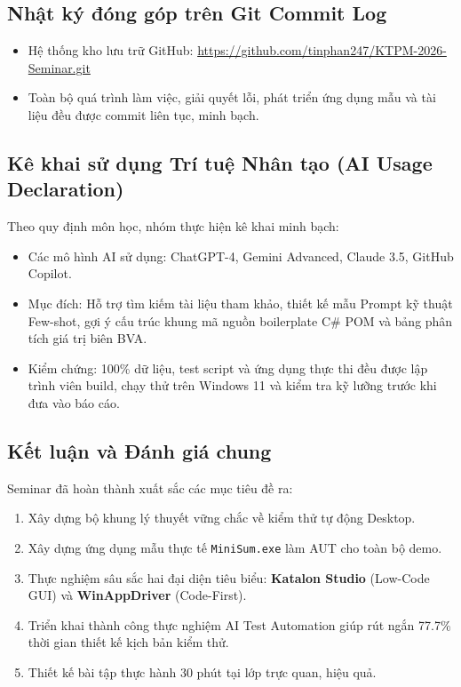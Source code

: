 \subsection{Nhật ký đóng góp trên Git Commit Log}
\begin{itemize}
    \item Hệ thống kho lưu trữ GitHub: \url{https://github.com/tinphan247/KTPM-2026-Seminar.git}
    \item Toàn bộ quá trình làm việc, giải quyết lỗi, phát triển ứng dụng mẫu và tài liệu đều được commit liên tục, minh bạch.
\end{itemize}

\subsection{Kê khai sử dụng Trí tuệ Nhân tạo (AI Usage Declaration)}
Theo quy định môn học, nhóm thực hiện kê khai minh bạch:
\begin{itemize}
    \item Các mô hình AI sử dụng: ChatGPT-4, Gemini Advanced, Claude 3.5, GitHub Copilot.
    \item Mục đích: Hỗ trợ tìm kiếm tài liệu tham khảo, thiết kế mẫu Prompt kỹ thuật Few-shot, gợi ý cấu trúc khung mã nguồn boilerplate C\# POM và bảng phân tích giá trị biên BVA.
    \item Kiểm chứng: 100\% dữ liệu, test script và ứng dụng thực thi đều được lập trình viên build, chạy thử trên Windows 11 và kiểm tra kỹ lưỡng trước khi đưa vào báo cáo.
\end{itemize}

\subsection{Kết luận và Đánh giá chung}
Seminar đã hoàn thành xuất sắc các mục tiêu đề ra:
\begin{enumerate}
    \item Xây dựng bộ khung lý thuyết vững chắc về kiểm thử tự động Desktop.
    \item Xây dựng ứng dụng mẫu thực tế \texttt{MiniSum.exe} làm AUT cho toàn bộ demo.
    \item Thực nghiệm sâu sắc hai đại diện tiêu biểu: \textbf{Katalon Studio} (Low-Code GUI) và \textbf{WinAppDriver} (Code-First).
    \item Triển khai thành công thực nghiệm AI Test Automation giúp rút ngắn 77.7\% thời gian thiết kế kịch bản kiểm thử.
    \item Thiết kế bài tập thực hành 30 phút tại lớp trực quan, hiệu quả.
\end{enumerate}
